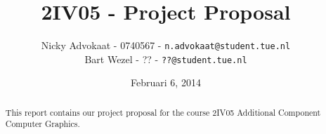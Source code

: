 \documentclass[a4paper,twoside,11pt]{article}
\title{\vspace{-\baselineskip}\sffamily\bfseries 2IV05 - Project Proposal}
\author{
Nicky Advokaat - 0740567 - {\tt n.advokaat@student.tue.nl} \\
Bart Wezel - ?? - {\tt ??@student.tue.nl}\\
}
\date{Februari 6, 2014}
\numberwithin{equation}{section}
\begin{document}
\maketitle
\thispagestyle{empty}
\begin{abstract}
This report contains our project proposal  for the course 2IV05 Additional Component Computer Graphics.
\end{abstract}




\end{document}

